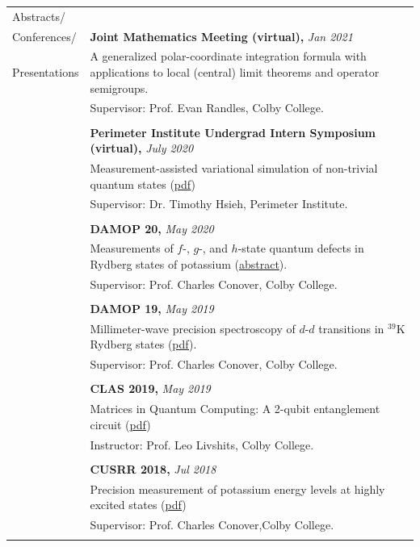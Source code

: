\documentclass[10pt]{article}
\begin{document}
\begin{longtable}{ l p{14.7cm}   }
\large{Abstracts/}   	& \\
\large{Conferences/}	& \textbf{Joint Mathematics Meeting (virtual),} \textit{Jan 2021}\\
\large{Presentations}	& A generalized polar-coordinate integration formula with applications to local (central) limit theorems and operator semigroups.\\
	& Supervisor: Prof. Evan Randles, Colby College. \\
	&\\
	& \textbf{Perimeter Institute Undergrad Intern Symposium (virtual),} \textit{July 2020}\\
	& Measurement-assisted variational simulation of non-trivial quantum states (\href{https://huanqbui.com/LaTeX 20projects/HuanBui_Perimeter/Presentation/MBQC_as_Simulation.pdf}{{pdf}})\\
& Supervisor: Dr. Timothy Hsieh, Perimeter Institute. \\
	&\\
	& \textbf{DAMOP 20,} \textit{May 2020}\\
	& Measurements of $f$-, $g$-, and $h$-state quantum defects in Rydberg states of potassium (\href{http://meetings.aps.org/Meeting/DAMOP20/Session/K01.17}{abstract}).\\
	& Supervisor: Prof. Charles Conover, Colby College.\\
	&\\
	& \textbf{DAMOP 19,} \textit{May 2019} \\
	& Millimeter-wave precision spectroscopy of $d$-$d$ transitions in $^{\text{39}}$K Rydberg states (\href{https://huanqbui.com/research/DAMOP19 20poster/DAMOP19.pdf}{{pdf}}).\\
	& Supervisor: Prof. Charles Conover, Colby College.\\
	& \\
	& \textbf{CLAS 2019,} \textit{May 2019}\\
	& Matrices in Quantum Computing: A 2-qubit entanglement circuit (\href{https://huanqbui.com/LaTeX 20projects/Matrix_Analysis/CLAS 202019/Quantum-Circuit.pdf}{{pdf}})\\
	& Instructor: Prof. Leo Livshits, Colby College.\\
	&\\
	& \textbf{CUSRR 2018,} \textit{Jul 2018}\\
	& Precision measurement of potassium energy levels at highly excited states (\href{https://huanqbui.com/research/CUSRR2018.pdf}{{pdf}})\\
	& Supervisor: Prof. Charles Conover,Colby College.\\
	& \\ 
	

\end{longtable}
\end{document}

